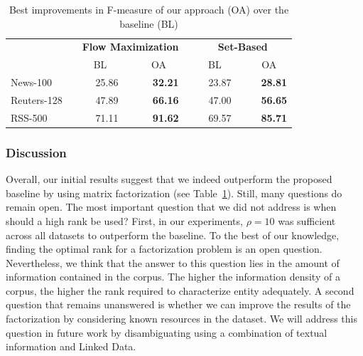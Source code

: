 \begin{table}[htb]
    \caption{Best improvements in F-measure of our approach (OA) over the baseline (BL)}
    \begin{tabular}{lp{1cm}p{0.25cm}rp{1cm}p{0.25cm}rp{1cm}p{0.25cm}rp{1cm}p{0.25cm}r}
    \toprule
     && \multicolumn{5}{c}{\textbf{Flow Maximization}} && \multicolumn{5}{c}{\textbf{Set-Based}} \\
     && \multicolumn{2}{c}{BL} && \multicolumn{2}{c}{OA} && \multicolumn{2}{c}{BL} && \multicolumn{2}{c}{OA} \\
    \midrule
    News-100        &&& 25.86  &&& \textbf{32.21} &&& 23.87  &&& \textbf{28.81} \\
	Reuters-128     &&& 47.89  &&& \textbf{66.16} &&& 47.00  &&& \textbf{56.65} \\
	RSS-500         &&& 71.11  &&& \textbf{91.62} &&& 69.57  &&& \textbf{85.71} \\
	\bottomrule
	\end{tabular}
	\centering
	\label{tab:improvements}
\end{table}


\subsubsection{Discussion}
Overall, our initial results suggest that we indeed outperform the proposed baseline by using matrix factorization (see Table~\ref{tab:improvements}).
Still, many questions do remain open.
The most important question that we did not address is when should a high rank be used?
First, in our experiments, $\rho=10$ was sufficient across all datasets to outperform the baseline. 
To the best of our knowledge, finding the optimal rank for a factorization problem is an open question.
Nevertheless, we think that the answer to this question lies in the amount of information contained in the corpus.
The higher the information density of a corpus, the higher the rank required to characterize entity adequately.
A second question that remains unanswered is whether we can improve the results of the factorization by considering known resources in the dataset.
We will address this question in future work by disambiguating using a combination of textual information and Linked Data.

